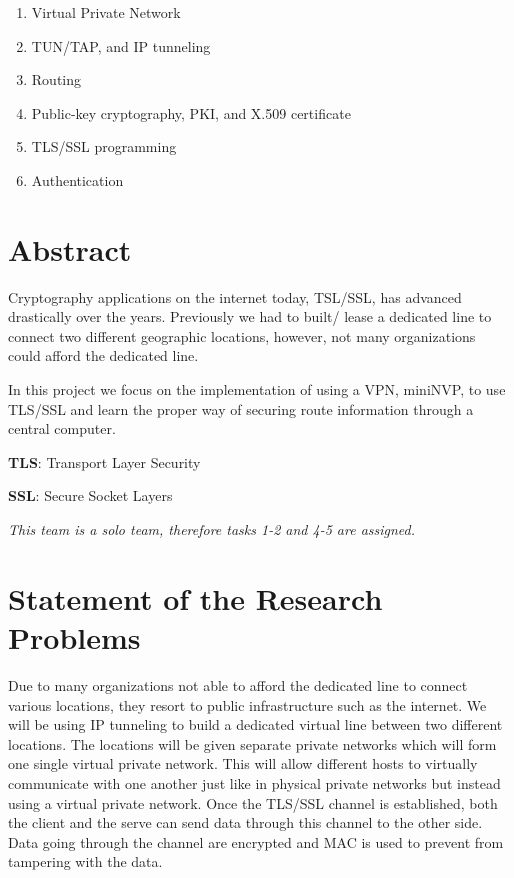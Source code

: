 \documentclass[12pt]{article}
\begin{document}
\begin{enumerate}
    \item Virtual Private Network
    \item TUN/TAP, and IP tunneling
    \item Routing
    \item Public-key cryptography, PKI, and X.509 certificate
    \item TLS/SSL programming
    \item Authentication
\end{enumerate}

\clearpage


\section{Abstract}
Cryptography applications on the internet today, TSL/SSL, has advanced drastically over the years. Previously we  had to built/ lease a dedicated line to connect  two different geographic locations, however, not many organizations could afford the dedicated line. 

In this project we focus on the implementation of using a VPN, miniNVP, to use TLS/SSL and learn the proper way of securing route information through a central computer. 

 \item \textbf{TLS}: Transport Layer Security
 \item \textbf{SSL}: Secure Socket Layers
 
 \item \textit{This team is a solo team, therefore tasks 1-2 and 4-5 are assigned. }



\section{Statement of the Research Problems}
Due to many organizations not able to afford the dedicated line to connect various locations, they resort to public infrastructure such as the internet. We will be using IP tunneling to build a dedicated virtual line between two different locations. The locations will be given separate private networks which will form one single virtual private network. This will allow different hosts to virtually communicate with one another just like in physical private networks but instead using a virtual private network. Once the TLS/SSL channel is established, both the client and the serve can send data through this channel to the other side. Data going through the channel are encrypted and MAC is used to prevent from tampering with the data. 
\end{document}
